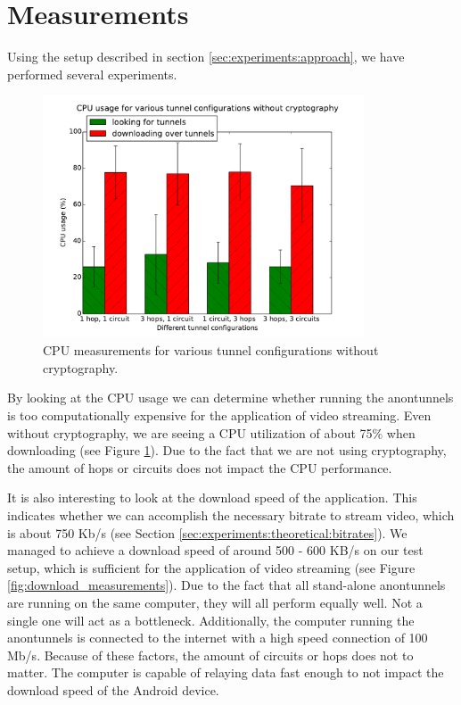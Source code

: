 \section{Measurements}
\label{sec:experiments:measurements}

Using the setup described in section \ref{sec:experiments:approach}, we have performed several experiments.

\begin{figure}[t]
	\centering
	\includegraphics[width=0.85\textwidth]{graphics/cpu.pdf}
	\caption{CPU measurements for various tunnel configurations without cryptography.}
	\label{fig:cpu_measurements}
\end{figure}

By looking at the CPU usage we can determine whether running the anontunnels is too computationally expensive for the application of video streaming. Even without cryptography, we are seeing a CPU utilization of about 75\% when downloading (see Figure \ref{fig:cpu_measurements}). Due to the fact that we are not using cryptography, the amount of hops or circuits does not impact the CPU performance.

It is also interesting to look at the download speed of the application. This indicates whether we can accomplish the necessary bitrate to stream video, which is about 750 Kb/s (see Section \ref{sec:experiments:theoretical:bitrates}). We managed to achieve a download speed of around 500 - 600 KB/s on our test setup, which is sufficient for the application of video streaming (see Figure \ref{fig:download_measurements}). Due to the fact that all stand-alone anontunnels are running on the same computer, they will all perform equally well. Not a single one will act as a bottleneck. Additionally, the computer running the anontunnels is connected to the internet with a high speed connection of 100 Mb/s. Because of these factors, the amount of circuits or hops does not to matter. The computer is capable of relaying data fast enough to not impact the download speed of the Android device.

